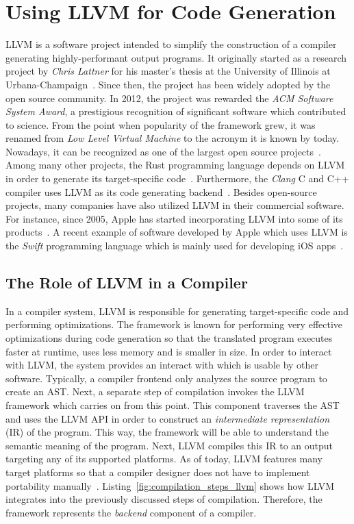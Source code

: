 \section{Using LLVM for Code Generation}

LLVM is a software project intended to simplify the construction of a compiler generating highly-performant output programs.
It originally started as a research project by \emph{Chris Lattner} for his master's thesis at the University of Illinois at Urbana-Champaign~\cite{Lattner:MSThesis02}.
Since then, the project has been widely adopted by the open source community.
In 2012, the project was rewarded the \emph{ACM Software System Award}, a prestigious recognition of significant software which contributed to science.
From the point when popularity of the framework grew, it was renamed from \emph{Low Level Virtual Machine} to the acronym it is known by today.
Nowadays, it can be recognized as one of the largest open source projects~\cite[preface]{Cardoso_Lopes2014-jt}.
Among many other projects, the Rust programming language depends on LLVM in order to generate its target-specific code~\cite[p.~373]{McNamara2021-hz}.
Furthermore, the \emph{Clang} C and C++ compiler uses LLVM as its code generating backend~\cite[preface]{Hsu2021-ez}.
Besides open-source projects, many companies have also utilized LLVM in their commercial software.
For instance, since 2005, Apple has started incorporating LLVM into some of its products~\cite[pp.~11-15]{Fandrey}.
A recent example of software developed by Apple which uses LLVM is the \emph{Swift} programming language which is mainly used for developing iOS apps~\cite[preface]{Hsu2021-ez}.

\subsection{The Role of LLVM in a Compiler}

In a compiler system, LLVM is responsible for generating target-specific code and performing optimizations.
The framework is known for performing very effective optimizations during code generation so that the translated program executes faster at runtime, uses less memory and is smaller in size.
In order to interact with LLVM, the system provides an interact with which is usable by other software\@.
Typically, a compiler frontend only analyzes the source program to create an AST\@.
Next, a separate step of compilation invokes the LLVM framework which carries on from this point\@.
This component traverses the AST and uses the LLVM API in order to construct an \emph{intermediate representation} (IR) of the program.
This way, the framework will be able to understand the semantic meaning of the program.
Next, LLVM compiles this IR to an output targeting any of its supported platforms.
As of today, LLVM features many target platforms so that a compiler designer does not have to implement portability manually~\cite[preface]{Hsu2021-ez}.
Listing~\ref{fig:compilation_steps_llvm} shows how LLVM integrates into the previously discussed steps of compilation.
Therefore, the framework represents the \emph{backend} component of a compiler.

